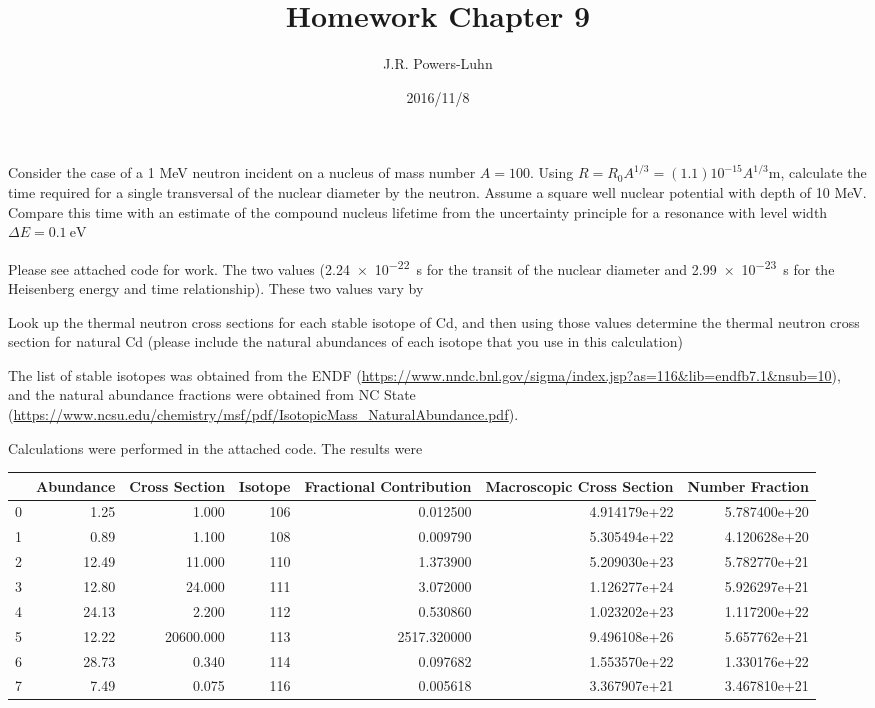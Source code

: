 \documentclass{hw}
\author{J.R. Powers-Luhn}
\date{2016/11/8}
\title{Homework Chapter 9}
\begin{document}
Consider the case of a 1 MeV neutron incident on a nucleus of mass number $A = 100$. Using $R=R_0 A^{1/3}=(1.1)10^{-15} A^{1/3}$m, calculate the time required for a single transversal of the nuclear diameter by the neutron. Assume a square well nuclear potential with depth of 10 MeV. Compare this time with an estimate of the compound nucleus lifetime from the uncertainty principle for a resonance with level width $\Delta E=\SI{0.1}{\electronvolt}$

\solution
Please see attached code for work. The two values (\SI{2.24e-22}{\second} for the transit of the nuclear diameter and \SI{2.99e-23}{\second} for the Heisenberg energy and time relationship). These two values vary by 

\problem{}
Look up the thermal neutron cross sections for each stable isotope of Cd, and then using those
values determine the thermal neutron cross section for natural Cd (please include the natural
abundances of each isotope that you use in this calculation)

\solution
The list of stable isotopes was obtained from the ENDF (\url{https://www.nndc.bnl.gov/sigma/index.jsp?as=116&lib=endfb7.1&nsub=10}), and the natural abundance fractions were obtained from NC State (\url{https://www.ncsu.edu/chemistry/msf/pdf/IsotopicMass_NaturalAbundance.pdf}).

Calculations were performed in the attached code. The results were

\begin{tabular}{lrrrrrr}
\toprule
{} &  Abundance &  Cross Section &  Isotope &  Fractional Contribution &  Macroscopic Cross Section &  Number Fraction \\
\midrule
0 &       1.25 &          1.000 &      106 &                               0.012500 &               4.914179e+22 &     5.787400e+20 \\
1 &       0.89 &          1.100 &      108 &                               0.009790 &               5.305494e+22 &     4.120628e+20 \\
2 &      12.49 &         11.000 &      110 &                               1.373900 &               5.209030e+23 &     5.782770e+21 \\
3 &      12.80 &         24.000 &      111 &                               3.072000 &               1.126277e+24 &     5.926297e+21 \\
4 &      24.13 &          2.200 &      112 &                               0.530860 &               1.023202e+23 &     1.117200e+22 \\
5 &      12.22 &      20600.000 &      113 &                            2517.320000 &               9.496108e+26 &     5.657762e+21 \\
6 &      28.73 &          0.340 &      114 &                               0.097682 &               1.553570e+22 &     1.330176e+22 \\
7 &       7.49 &          0.075 &      116 &                               0.005618 &               3.367907e+21 &     3.467810e+21 \\
\bottomrule
\end{tabular}
\end{document}

